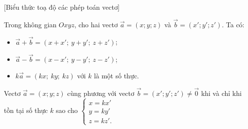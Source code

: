[Biểu thức toạ độ các phép toán vectơ]

\lithuyet

\begin{congthuc}
Trong không gian $Oxyz$, cho hai vectơ $\vec a=(x;y;z)$ và $\vec b=(x';y';z')$. Ta có:
\begin{itemize}
  \item $\vec a+\vec b=(x+x';\ y+y';\ z+z')$;
  \item $\vec a-\vec b=(x-x';\ y-y';\ z-z')$;
  \item $k\vec a=(kx;\ ky;\ kz)$ với $k$ là một số thực.
\end{itemize}
\end{congthuc}

\begin{nhanxet}
Vectơ $\vec a=(x;y;z)$ cùng phương với vectơ $\vec b=(x';y';z')\ne\vec0$ khi và chỉ khi tồn tại số thực $k$ sao cho $\begin{cases}x=kx'\\y=ky'\\z=kz'.\end{cases}$
\end{nhanxet}

